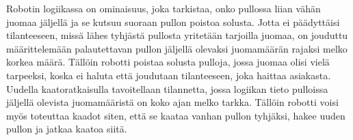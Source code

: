 Robotin logiikassa on ominaisuus, joka tarkistaa, onko pullossa liian vähän juomaa jäljellä ja se kutsuu suoraan pullon poistoa solusta. Jotta ei päädyttäisi tilanteeseen, missä lähes tyhjästä pullosta yritetään tarjoilla juomaa, on jouduttu määrittelemään palautettavan pullon jäljellä olevaksi juomamäärän rajaksi melko korkea määrä. Tällöin robotti poistaa solusta pulloja, jossa juomaa olisi vielä tarpeeksi, koska ei haluta että joudutaan tilanteeseen, joka haittaa asiakasta. Uudella kaatoratkaisulla tavoitellaan tilannetta, jossa logiikan tieto pulloissa jäljellä olevista juomamääristä on koko ajan melko tarkka. Tällöin robotti voisi myös toteuttaa kaadot siten, että se kaataa vanhan pullon tyhjäksi, hakee uuden pullon ja jatkaa kaatoa siitä.
